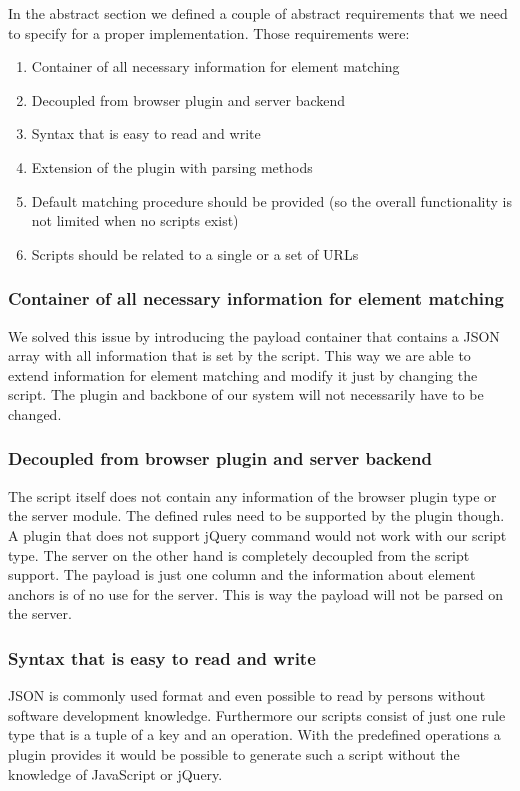 In the abstract section we defined a couple of abstract requirements that we need to specify for a proper implementation. Those requirements were:

\begin{enumerate}
	\item Container of all necessary information for element matching
	\item Decoupled from browser plugin and server backend
	\item Syntax that is easy to read and write
	\item Extension of the plugin with parsing methods
	\item Default matching procedure should be provided (so the overall functionality is not limited when no scripts exist)
	\item Scripts should be related to a single or a set of URLs
\end{enumerate}

\subsubsection{Container of all necessary information for element matching}

We solved this issue by introducing the payload container that contains a JSON array with all information that is set by the script. This way we are able to extend information for element matching and modify it just by changing the script. The plugin and backbone of our system will not necessarily have to be changed. 

\subsubsection{Decoupled from browser plugin and server backend}
The script itself does not contain any information of the browser plugin type or the server module. The defined rules need to be supported by the plugin though. A plugin that does not support jQuery command would not work with our script type. The server on the other hand is completely decoupled from the script support. The payload is just one column and the information about element anchors is of no use for the server. This is way the payload will not be parsed on the server. 

\subsubsection{Syntax that is easy to read and write}
JSON is commonly used format and even possible to read by persons without software development knowledge. Furthermore our scripts consist of just one rule type that is a tuple of a key and an operation. With the predefined operations a plugin provides it would be possible to generate such a script without the knowledge of JavaScript or jQuery. 

